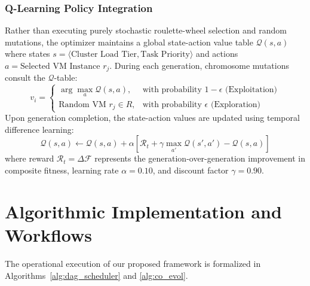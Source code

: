 \documentclass[default,sn-mathphys-num]{sn-jnl}
\theoremstyle{thmstyleone}
\theoremstyle{thmstyletwo}
\theoremstyle{thmstylethree}
\begin{document}
\subsubsection{Q-Learning Policy Integration}
Rather than executing purely stochastic roulette-wheel selection and random mutations, the optimizer maintains a global state-action value table $\mathcal{Q}(s, a)$ where states $s = \langle \text{Cluster Load Tier}, \text{Task Priority} \rangle$ and actions $a = \text{Selected VM Instance } r_j$. During each generation, chromosome mutations consult the $\mathcal{Q}$-table:
\begin{equation}
v_i = 
\begin{cases}
\arg\max_{a} \mathcal{Q}(s, a), & \text{with probability } 1 - \epsilon \text{ (Exploitation)} \\
\text{Random VM } r_j \in R, & \text{with probability } \epsilon \text{ (Exploration)}
\end{cases}
\end{equation}
Upon generation completion, the state-action values are updated using temporal difference learning:
\begin{equation}
\mathcal{Q}(s, a) \leftarrow \mathcal{Q}(s, a) + \alpha \left[ \mathcal{R}_t + \gamma \max_{a'} \mathcal{Q}(s', a') - \mathcal{Q}(s, a) \right]
\end{equation}
where reward $\mathcal{R}_t = \Delta \mathcal{F}$ represents the generation-over-generation improvement in composite fitness, learning rate $\alpha = 0.10$, and discount factor $\gamma = 0.90$.

\section{Algorithmic Implementation and Workflows}\label{sec:algorithms}

The operational execution of our proposed framework is formalized in Algorithms~\ref{alg:dag_scheduler} and \ref{alg:co_evol}.
\end{document}
